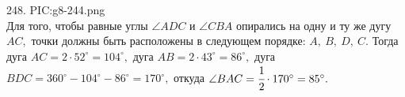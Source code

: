 248. {{PIC:g8-244.png}}\\
Для того, чтобы равные углы $\angle ADC$ и $\angle CBA$ опирались на одну и ту же дугу $AC,$ точки должны быть расположены в следующем порядке: $A,\ B,\ D,\ C.$ Тогда дуга $AC=2\cdot 52^\circ=104^\circ,$ дуга $AB=2\cdot43^\circ=86^\circ,$ дуга $BDC=360^\circ-104^\circ-86^\circ=170^\circ,$ откуда $\angle BAC=\cfrac{1}{2}\cdot 170^\circ=85^\circ.$\\
